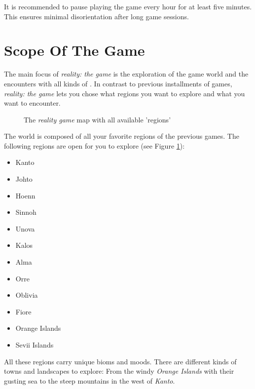 It is recommended to pause playing the game every hour for at least five minutes. This ensures minimal disorientation after long game sessions.

\section{Scope Of The Game}

The main focus of \emph{\poke{} reality: the game} is the exploration of the game world and the encounters with all kinds of \poke{}. In contrast to previous installments of \poke{} games, \emph{\poke{} reality: the game} lets you chose what regions you want to explore and what \poke{} you want to encounter.

\begin{figure}[!ht]
\begin{center}
{%
\setlength{\fboxsep}{2pt}%
\setlength{\fboxrule}{1pt}%
%
}%
\end{center}
\caption[The \emph{\pokeT{} reality game} map with all available 'regions']{The \emph{\poke{} reality game} map with all available 'regions'}
\label{pokemap}
\end{figure}

The \poke{} world is composed of all your favorite regions of the previous games. The following regions are open for you to explore (see Figure \ref{pokemap}):
\begin{multicols}{2}
\begin{itemize}
\item Kanto
\item Johto
\item Hoenn
\item Sinnoh
\item Unova
\item Kalos
\item Alma
\item Orre
\item Oblivia
\item Fiore
\item Orange Islands
\item Sevii Islands
\end{itemize} 
\end{multicols}

All these regions carry unique bioms and moods. There are different kinds of towns and landscapes to explore: From the windy \emph{Orange Islands} with their gusting sea to the steep mountains in the west of \emph{Kanto}.

